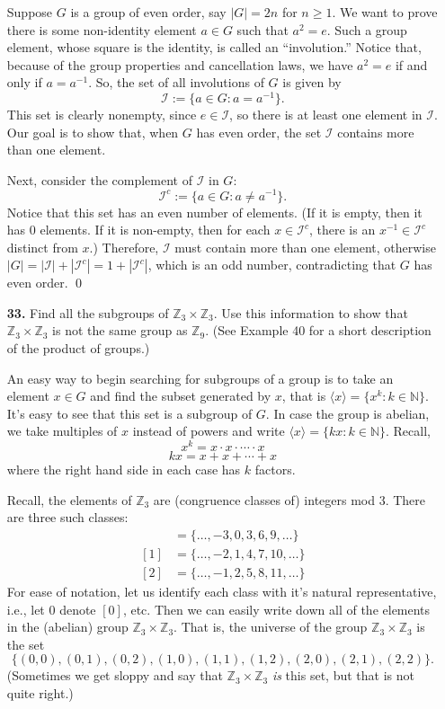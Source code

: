 \documentclass[12pt,reqno]{amsart}
\newcommand{\N}{\ensuremath{\mathbb{N}}}
\newcommand{\<}{\ensuremath{\langle}}
\renewcommand{\>}{\ensuremath{\rangle}}
\newcommand{\Z}{\ensuremath{\mathbb{Z}}}
\begin{document}
\begin{enumerate}
\medskip
{} Suppose $G$ is a group of even order, say $|G| = 2n$
for $n\geq 1$.  We want to prove there is some non-identity element $a\in G$ such
that $a^2 = e$.  Such a group element, whose square is
the identity, is called an ``involution.''  Notice that, because of the group
properties and cancellation laws, we have
$a^2 = e$ if and only if $a = a^{-1}$.  So, the set of all involutions of $G$ is
given by
\[
\mathcal{I} := \{a \in G : a = a^{-1}\}.
\]
This set is clearly nonempty, since $e\in \mathcal{I}$, so there is at least one
element in $\mathcal{I}$.  Our goal is to show
that, when $G$ has even order, the set $\mathcal{I}$ contains more than one element.

Next, consider the complement of $\mathcal{I}$ in $G$:
\[
\mathcal{I}^c := \{a \in G : a \neq a^{-1}\}.
\]
Notice that this set has an even number of elements.  (If it is empty, then it
has 0 elements.  If it is non-empty, then for each $x\in \mathcal{I}^c$, there
is an $x^{-1} \in \mathcal{I}^c$ distinct from $x$.)
Therefore, 
$\mathcal{I}$ must contain more than one element, otherwise 
$|G| = |\mathcal{I}| + |\mathcal{I}^c| = 1+ |\mathcal{I}^c|$, which is an odd
number, contradicting that $G$ has even order.
\qed
\medskip

\item[{\bf 33.}]
Find all the subgroups of ${\mathbb Z}_3 \times {\mathbb Z}_3$. Use this
information to show that ${\mathbb Z}_3 \times {\mathbb Z}_3$ is not the
same group as ${\mathbb Z}_9$.  (See Example 40 for a short description of the
product of groups.) 

\medskip
{}
\medskip
An easy way to begin searching for subgroups of a group is to take an element 
$x \in G$ and find the subset generated by $x$, that is $\<x\> = \{x^k : k \in \N\}$.
It's easy to see that this set is a subgroup of $G$.  In case the group is
abelian, we take multiples of $x$ instead of powers and write 
$\<x \> = \{kx : k \in \N\}$.  Recall, 
\[
x^k = x \cdot x\cdot \cdots \cdot x
\]
\[
kx = x + x + \cdots + x
\]
where the right hand side in each case has $k$ factors.

Recall, the elements of $\Z_3$ are (congruence classes of) integers mod 3. There
are three such classes:
\begin{align*}
[0] &= \{\dots, -3, 0, 3, 6, 9, \dots\}  \\
[1] &= \{\dots, -2, 1, 4, 7, 10, \dots\}  \\
[2] &= \{\dots, -1, 2, 5, 8, 11, \dots\}  
\end{align*}
For ease of notation, let us identify each class with it's natural
representative, i.e., let $0$ denote $[0]$, etc.
Then we can easily write down all of the elements in the (abelian) group 
$\Z_3 \times \Z_3$.  That is, the universe of the 
group $\Z_3 \times \Z_3$ is the set
\[
\{(0,0), (0,1), (0,2),
(1,0), (1,1), (1,2),
(2,0), (2,1), (2,2)\}.
\]
(Sometimes we get sloppy and say that $\Z_3 \times \Z_3$ \emph{is} this
set, but that is not quite right.)


\end{enumerate}
\end{document}
